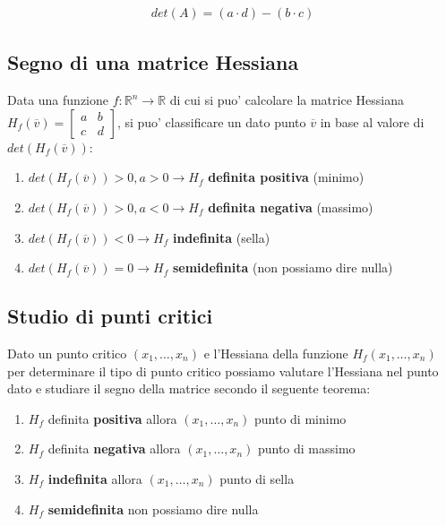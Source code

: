 \documentclass{article}
\begin{document}
\begin{align*}
  det(A) = (a \cdot d) - (b \cdot c)
\end{align*}

\subsection{Segno di una matrice Hessiana}

Data una funzione $f: \mathbb{R}^n \to \mathbb{R}$ di cui si puo' calcolare la
matrice Hessiana $H_f(\overline{v}) = \begin{bmatrix} a & b \\ c & d \end{bmatrix}$,
si puo' classificare un dato punto $\overline{v}$ in base al valore di $det(H_f(\overline{v}))$:

\begin{enumerate}
  \item $det(H_f(\overline{v})) > 0, a > 0
    \longrightarrow H_f$ \textbf{definita positiva} (minimo)
  \item $det(H_f(\overline{v})) > 0, a < 0
    \longrightarrow H_f$ \textbf{definita negativa} (massimo)
  \item $det(H_f(\overline{v})) < 0 \longrightarrow H_f$
    \textbf{indefinita} (sella)
  \item $det(H_f(\overline{v})) = 0 \longrightarrow H_f$
    \textbf{semidefinita} (non possiamo dire nulla)
\end{enumerate}

\subsection{Studio di punti critici}

Dato un punto critico $(x_1, \ldots, x_n)$ e l'Hessiana della funzione $H_f(x_1, \ldots, x_n)$
per determinare il tipo di punto critico possiamo valutare l'Hessiana nel punto
dato e studiare il segno della matrice secondo il seguente teorema:

\begin{enumerate}
  \item $H_f$ definita \textbf{positiva} allora $(x_1, \ldots, x_n)$ punto di minimo
  \item $H_f$ definita \textbf{negativa} allora $(x_1, \ldots, x_n)$ punto di massimo
  \item $H_f$ \textbf{indefinita} allora $(x_1, \ldots, x_n)$ punto di sella
  \item $H_f$ \textbf{semidefinita} non possiamo dire nulla
\end{enumerate}
\end{document}
